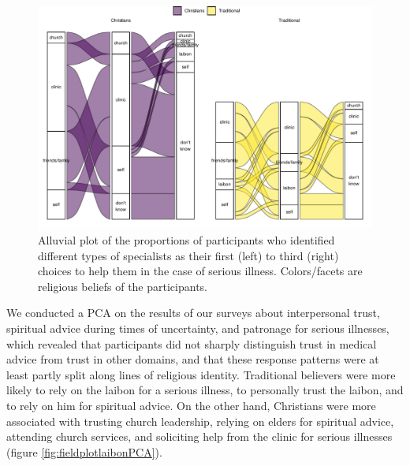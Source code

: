 \documentclass[
  11pt,
]{article}
\begin{document}
\begin{landscape}

\begin{figure}[p]

{\centering \includegraphics{magic-healers-article2_files/figure-latex/fieldplotillness-1} 

}

\caption{Alluvial plot of the proportions of participants who identified different types of specialists as their first (left) to third (right) choices to help them in the case of serious illness. Colors/facets are religious beliefs of the participants.}\label{fig:fieldplotillness}
\end{figure}

\end{landscape}

We conducted a PCA on the results of our surveys about interpersonal trust, spiritual advice during times of uncertainty, and patronage for serious illnesses, which revealed that participants did not sharply distinguish trust in medical advice from trust in other domains, and that these response patterns were at least partly split along lines of religious identity. Traditional believers were more likely to rely on the laibon for a serious illness, to personally trust the laibon, and to rely on him for spiritual advice. On the other hand, Christians were more associated with trusting church leadership, relying on elders for spiritual advice, attending church services, and soliciting help from the clinic for serious illnesses (figure \ref{fig:fieldplotlaibonPCA}).
\end{document}
